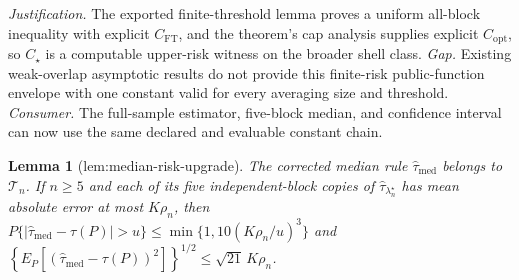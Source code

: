 \documentclass{article}
\newtheorem{lemma}{Lemma}
\begin{document}
\par\smallskip\noindent \textit{Justification.} The exported finite-threshold lemma proves a uniform all-block inequality with explicit \(C_{\mathrm{FT}}\), and the theorem's cap analysis supplies explicit \(C_{\mathrm{opt}}\), so \(C_\star\) is a computable upper-risk witness on the broader shell class. \textit{Gap.} Existing weak-overlap asymptotic results do not provide this finite-risk public-function envelope with one constant valid for every averaging size and threshold. \textit{Consumer.} The full-sample estimator, five-block median, and confidence interval can now use the same declared and evaluable constant chain.

\begin{lemma}[lem:median-risk-upgrade]\label{lem:median-risk-upgrade}
The corrected median rule \(\widehat\tau_{\mathrm{med}}\) belongs to \(\mathcal T_n\). If \(n\ge5\) and each of its five independent-block copies of \(\widehat\tau_{\lambda_n^{\star}}\) has mean absolute error at most \(K\rho_n\), then \(P\{|\widehat\tau_{\mathrm{med}}-\tau(P)|>u\}\le\min\{1,10(K\rho_n/u)^3\}\) and \(\left\{E_P\!\left[(\widehat\tau_{\mathrm{med}}-\tau(P))^2\right]\right\}^{1/2}\le\sqrt{21}\,K\rho_n\).
\end{lemma}
\end{document}
